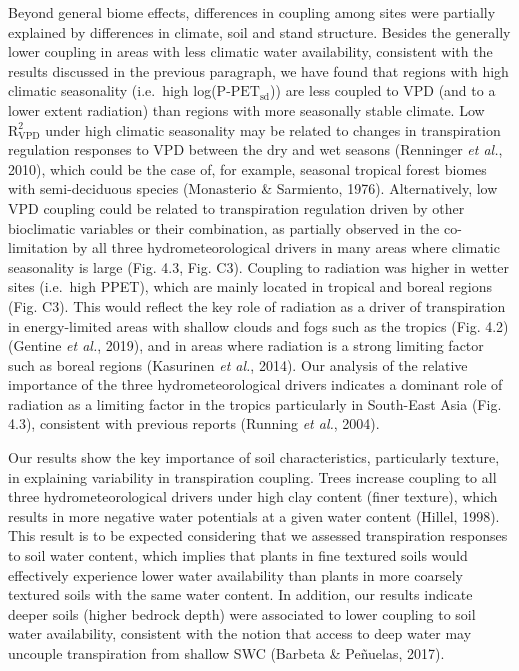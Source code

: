\documentclass[11pt,twoside]{reedthesis}
\begin{document}
Beyond general biome effects, differences in coupling among sites were
partially explained by differences in climate, soil and stand structure.
Besides the generally lower coupling in areas with less climatic water
availability, consistent with the results discussed in the previous
paragraph, we have found that regions with high climatic seasonality
(i.e.~high log(\(\text{P-PET}_{\text{sd}}\))) are less coupled to VPD
(and to a lower extent radiation) than regions with more seasonally
stable climate. Low \(\text{R}^2_{\text{VPD}}\) under high climatic
seasonality may be related to changes in transpiration regulation
responses to VPD between the dry and wet seasons (Renninger \emph{et
al.}, 2010), which could be the case of, for example, seasonal tropical
forest biomes with semi-deciduous species (Monasterio \& Sarmiento,
1976). Alternatively, low VPD coupling could be related to transpiration
regulation driven by other bioclimatic variables or their combination,
as partially observed in the co-limitation by all three
hydrometeorological drivers in many areas where climatic seasonality is
large (Fig. 4.3, Fig. C3). Coupling to radiation was higher in wetter
sites (i.e.~high PPET), which are mainly located in tropical and boreal
regions (Fig. C3). This would reflect the key role of radiation as a
driver of transpiration in energy-limited areas with shallow clouds and
fogs such as the tropics (Fig. 4.2) (Gentine \emph{et al.}, 2019), and
in areas where radiation is a strong limiting factor such as boreal
regions (Kasurinen \emph{et al.}, 2014). Our analysis of the relative
importance of the three hydrometeorological drivers indicates a dominant
role of radiation as a limiting factor in the tropics particularly in
South-East Asia (Fig. 4.3), consistent with previous reports (Running
\emph{et al.}, 2004).\par

Our results show the key importance of soil characteristics,
particularly texture, in explaining variability in transpiration
coupling. Trees increase coupling to all three hydrometeorological
drivers under high clay content (finer texture), which results in more
negative water potentials at a given water content (Hillel, 1998). This
result is to be expected considering that we assessed transpiration
responses to soil water content, which implies that plants in fine
textured soils would effectively experience lower water availability
than plants in more coarsely textured soils with the same water content.
In addition, our results indicate deeper soils (higher bedrock depth)
were associated to lower coupling to soil water availability, consistent
with the notion that access to deep water may uncouple transpiration
from shallow SWC (Barbeta \& Peñuelas, 2017).\par
\end{document}
